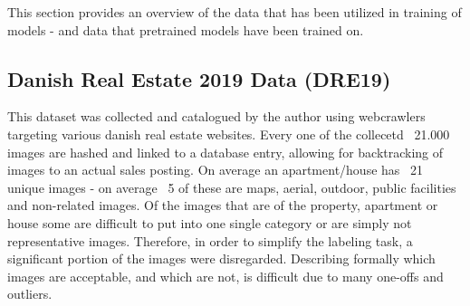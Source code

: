 This section provides an overview of the data that has been utilized in training of models - and data that pretrained models have been trained on.

\subsection{Danish Real Estate 2019 Data (DRE19)}\label{sec:DRE19}
This dataset was collected and catalogued by the author using webcrawlers targeting various danish real estate websites. 
Every one of the collecetd ~21.000 images are hashed and linked to a database entry, allowing for backtracking of images to an actual sales posting.
\newline
On average an apartment/house has ~21 unique images - on average ~5 of these are maps, aerial, outdoor, public facilities and non-related images.
Of the images that are of the property, apartment or house some are difficult to put into one single category or are simply not representative images.
Therefore, in order to simplify the labeling task, a significant portion of the images were disregarded.
\newline
Describing formally which images are acceptable, and which are not, is difficult due to many one-offs and outliers.
